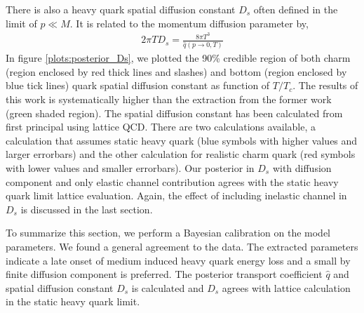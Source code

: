 \documentclass[aps, prc, reprint, amsmath, groupedaddress, nofootinbib]{revtex4-1}
\begin{document}
There is also a heavy quark spatial diffusion constant $D_s$ often defined in the limit of $p\ll M$.
It is related to the momentum diffusion parameter by,
\begin{eqnarray}
2\pi T D_s = \frac{8\pi T^3}{\hat{q}(p\rightarrow 0, T)}
\end{eqnarray}
In figure \ref{plots:posterior_Ds}, we plotted the 90\% credible region of both charm (region enclosed by red thick lines and slashes) and bottom (region enclosed by blue tick lines) quark spatial diffusion constant as function of $T/T_c$.
The results of this work is systematically higher than the extraction from the former work (green shaded region).
The spatial diffusion constant has been calculated from first principal using lattice QCD.
There are two calculations available, a calculation that assumes static heavy quark (blue symbols with higher values and larger errorbars) and the other calculation for realistic charm quark (red symbols with lower values and smaller errorbars).
Our posterior in $D_s$ with diffusion component and only elastic channel contribution agrees with the static heavy quark limit lattice evaluation.
Again, the effect of including inelastic channel in $D_s$ is discussed in the last section.

To summarize this section, we perform a Bayesian calibration on the model parameters. 
We found a general agreement to the data.
The extracted parameters indicate a late onset of medium induced heavy quark energy loss and a small by finite diffusion component is preferred.
The posterior transport coefficient $\hat{q}$ and spatial diffusion constant $D_s$ is calculated and $D_s$ agrees with lattice calculation in the static heavy quark limit. 
\end{document}
